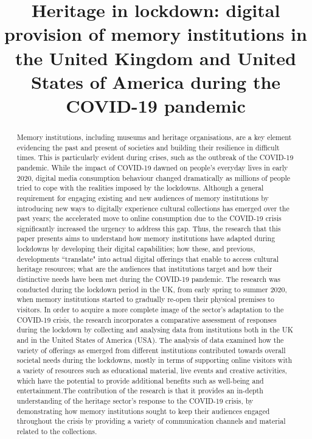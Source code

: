 \documentclass{egpubl}
\title[Heritage in lockdown: digital provision of memory institutions during the COVID-19 pandemic]%
      {Heritage in lockdown: digital provision of memory institutions in the United Kingdom and United States of America during the COVID-19 pandemic}
\begin{document}

\maketitle
\begin{abstract}
Memory institutions, including museums and heritage organisations, are a key element evidencing the past and present of societies and building their resilience in difficult times. This is particularly evident during crises, such as the outbreak of the COVID-19 pandemic. While the impact of COVID-19 dawned on people's everyday lives in early 2020, digital media consumption behaviour changed dramatically as millions of people tried to cope with the realities imposed by the lockdowns. Although a general requirement for engaging existing and new audiences of memory institutions by introducing new ways to digitally experience cultural collections has emerged over the past years; the accelerated move to online consumption due to the COVID-19 crisis significantly increased the urgency to address this gap. Thus, the research that this paper presents aims to understand how memory institutions have adapted during lockdowns by developing their digital capabilities; how these, and previous, developments ``translate" into actual digital offerings that enable to access cultural heritage resources; what are the audiences that institutions target and how their distinctive needs have been met during the COVID-19 pandemic. The research  was conducted during the lockdown period in the UK, from early spring to summer 2020, when memory institutions started to gradually re-open their physical premises to visitors. In order to acquire a more complete image of the sector's adaptation to the COVID-19 crisis, the research incorporates a comparative assessment of responses during the lockdown by collecting and analysing data from institutions both in the UK and in the United States of America (USA). The analysis of data examined how the variety of offerings as emerged from different institutions contributed towards overall societal needs during the lockdowns, mostly in terms of supporting online visitors with a variety of resources such as educational material, live events and creative activities, which have the potential to provide additional benefits such as well-being and entertainment.The contribution of the research is that it provides an in-depth understanding of the heritage sector's response to the COVID-19 crisis, by demonstrating how memory institutions sought to keep their audiences engaged throughout the crisis by providing a variety of communication channels and material related to the collections. 


\end{abstract}
\end{document}
